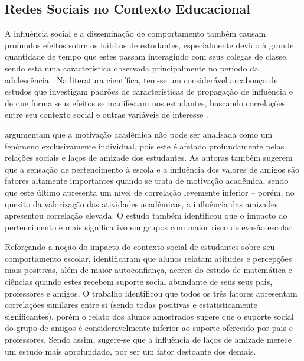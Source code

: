 \subsection{Redes Sociais no Contexto Educacional} \label{sec:networkseducation}

A influência social e a disseminação de comportamento também causam profundos efeitos sobre os hábitos de estudantes, especialmente devido à grande quantidade de tempo que estes passam interagindo com seus colegas de classe, sendo esta uma característica observada principalmente no período da adolescência \cite{Butler-Barnes2015}. Na literatura científica, tem-se um considerável arcabouço de estudos que investigam padrões de características de propagação de influência e de que forma seus efeitos se manifestam nos estudantes, buscando correlações entre seu contexto social e outras variáveis de interesse \cite{Flashman2012,Gremmen2017,Farmer1996,Blansky2013,Rambaran2017,Berndt1990}.

 argumentam que a motivação acadêmica não pode ser analisada como um fenômeno exclusivamente individual, pois este é afetado profundamente pelas relações sociais e laços de amizade dos estudantes. As autoras também sugerem que a sensação de pertencimento à escola e a influência dos valores de amigos são fatores altamente importantes quando se trata de motivação acadêmica, sendo que este último apresenta um nível de correlação levemente inferior -- porém, no quesito da valorização das atividades acadêmicas, a influência das amizades apresentou correlação elevada. O estudo também identificou que o impacto do pertencimento é mais significativo em grupos com maior risco de evasão escolar.

Reforçando a noção do impacto do contexto social de estudantes sobre seu comportamento escolar,  identificaram que alunos relatam atitudes e percepções mais positivas, além de maior autoconfiança, acerca do estudo de matemática e ciências quando estes recebem suporte social abundante de seus seus pais, professores e amigos. O trabalho identificou que todos os três fatores apresentam correlações similares entre si (sendo todas positivas e estatisticamente significantes), porém o relato dos alunos amostrados sugere que o suporte social do grupo de amigos é consideravelmente inferior ao suporte oferecido por pais e professores. Sendo assim, sugere-se que a influência de laços de amizade merece um estudo mais aprofundado, por ser um fator destoante dos demais.